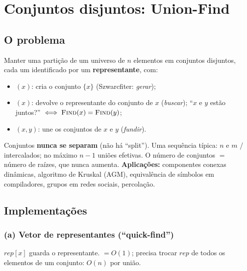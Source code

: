 \section{Conjuntos disjuntos: Union-Find}\label{sec:uf}

\subsection{O problema}
Manter uma partição de um universo de $n$ elementos em conjuntos disjuntos, cada um identificado por um \textbf{representante}, com:
\begin{itemize}
  \item \MakeSet$(x)$: cria o conjunto $\{x\}$ (Szwarcfiter: \emph{gerar});
  \item \Find$(x)$: devolve o representante do conjunto de $x$ (\emph{buscar}); ``$x$ e $y$ estão juntos?'' $\iff\textsc{Find}(x)=\textsc{Find}(y)$;
  \item \Union$(x,y)$: une os conjuntos de $x$ e $y$ (\emph{fundir}).
\end{itemize}
Conjuntos \textbf{nunca se separam} (não há ``split''). Uma sequência típica: $n$ \MakeSet{} e $m$ \Find/\Union{} intercalados; no máximo $n-1$ uniões efetivas. O número de conjuntos $=$ número de raízes, que nunca aumenta.
\textbf{Aplicações:} componentes conexas dinâmicas, algoritmo de Kruskal (AGM), equivalência de símbolos em compiladores, grupos em redes sociais, percolação.

\subsection{Implementações}
\subsubsection*{(a) Vetor de representantes (``quick-find'')}
$rep[x]$ guarda o representante. \Find$=O(1)$; \Union{} precisa trocar $rep$ de todos os elementos de um conjunto: $O(n)$ por união.

